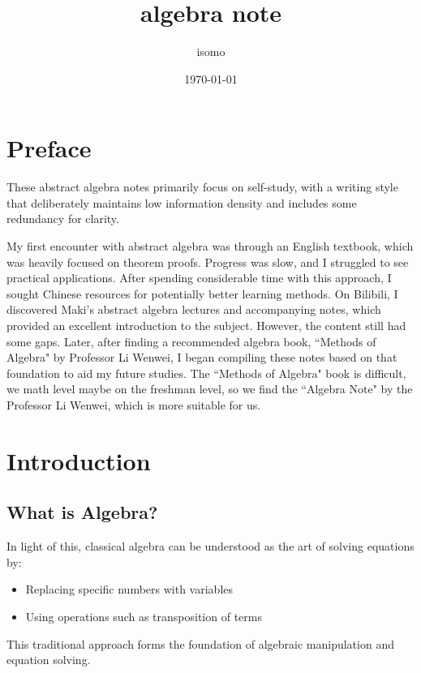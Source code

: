 \documentclass[11pt,lang=en]{elegantbook}
\title{algebra note}
\author{isomo}
\date{\today}
\begin{document}
\maketitle

\chapter*{Preface}

These abstract algebra notes primarily focus on self-study, with a writing style that deliberately maintains low information density and includes some redundancy for clarity.

My first encounter with abstract algebra was through an English textbook, which was heavily focused on theorem proofs. Progress was slow, and I struggled to see practical applications. After spending considerable time with this approach, I sought Chinese resources for potentially better learning methods. On Bilibili, I discovered Maki's abstract algebra lectures and accompanying notes, which provided an excellent introduction to the subject. However, the content still had some gaps. Later, after finding a recommended algebra book, ``Methods of Algebra" by Professor Li Wenwei, I began compiling these notes based on that foundation to aid my future studies. The ``Methods of Algebra" book is difficult, we math level maybe on the freshman level, so we find the ``Algebra Note" by the Professor Li Wenwei, which is more suitable for us.

\frontmatter
\tableofcontents

\mainmatter

\chapter{Introduction}

\section{What is Algebra?}

In light of this, classical algebra can be understood as the art of solving equations by:
\begin{itemize}
  \item Replacing specific numbers with variables
  \item Using operations such as transposition of terms
\end{itemize}

This traditional approach forms the foundation of algebraic manipulation and equation solving.
\end{document}
